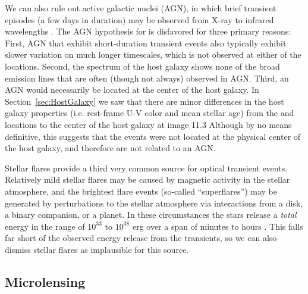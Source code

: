 We can also rule out active galactic nuclei (AGN), in which brief
transient episodes (a few days in duration) may be observed from X-ray
to infrared wavelengths \citep[e.g.][]{Gaskell:2003}.  The AGN
hypothesis for \spock is disfavored for three primary reasons:
First, AGN that exhibit short-duration transient events also typically
exhibit slower variation on much longer timescales, which is not
observed at either of the \spock locations. Second, the spectrum
of the \spock host galaxy shows none of the broad emission lines that
are often (though not always) observed in AGN.  Third, an AGN would
necessarily be located at the center of the host galaxy.
In Section~\ref{sec:HostGalaxy}
we saw that there are minor differences in the host galaxy properties
(i.e. rest-frame U-V color and mean stellar age) from the \spockone
and \spocktwo locations to the center of the host galaxy at image 11.3
Although by no means definitive, this suggests that the \spock events
were not located at the physical center of the host galaxy, and
therefore are not related to an AGN. 

Stellar flares provide a third very common source for optical
transient events. Relatively mild stellar flares may be caused by
magnetic activity in the stellar atmosphere, and the brightest flare
events (so-called ``superflares'') may be generated by perturbations
to the stellar atmosphere via interactions from a disk, a binary
companion, or a planet.  In these circumstances the stars release a
{\em total} energy in the range of $10^{33}$ to $10^{38}$ erg over a
span of minutes to hours \citep{Balona:2012,Karoff:2016}. This falls
far short of the observed energy release from the \spock transients,
so we can also dismiss stellar flares as implausible for this source.

\subsection{Microlensing}

